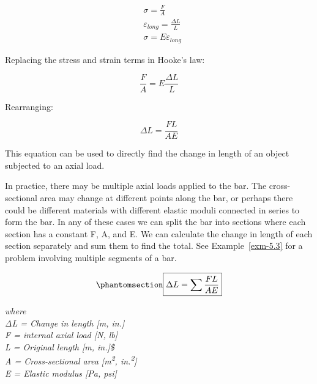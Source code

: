 \documentclass[
  letterpaper,
  DIV=11,
  numbers=noendperiod]{scrreprt}
\theoremstyle{definition}
\theoremstyle{remark}
\begin{document}
\[
\begin{aligned} & \sigma=\frac{F}{A} \\ & \varepsilon_{long}=\frac{\Delta L}{L} \\ & \sigma=E \varepsilon_{long}\end{aligned}
\]

Replacing the stress and strain terms in Hooke's law:

\[
\frac{F}{A}=E \frac{\Delta L}{L}
\]

Rearranging:

\[
\Delta L=\frac{F L}{A E}
\]

This equation can be used to directly find the change in length of an
object subjected to an axial load.

In practice, there may be multiple axial loads applied to the bar. The
cross-sectional area may change at different points along the bar, or
perhaps there could be different materials with different elastic moduli
connected in series to form the bar. In any of these cases we can split
the bar into sections where each section has a constant F, A, and E. We
can calculate the change in length of each section separately and sum
them to find the total. See Example~\ref{exm-5.3} for a problem
involving multiple segments of a bar.

\begin{equation}\phantomsection\label{eq-5.2}{
\boxed{\Delta L=\sum \frac{F L}{A E}}
}\end{equation}

\emph{where}\\
\emph{ΔL = Change in length {[}m, in.{]}}\\
\emph{F = internal axial load {[}N, lb{]}}\\
\emph{L = Original length {[}m, in.{]}\$}\\
\emph{A = Cross-sectional area {[}m\textsuperscript{2},
in.\textsuperscript{2}{]}}\\
\emph{E = Elastic modulus {[}Pa, psi{]}}
\end{document}
